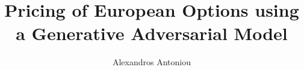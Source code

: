 \author{Alexandros Antoniou}
\title{\bfseries Pricing of European Options using a Generative Adversarial Model}
